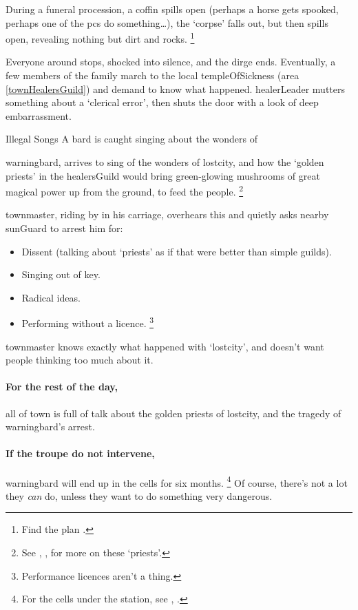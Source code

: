 During a funeral procession, a coffin spills open (perhaps a horse gets spooked, perhaps one of the \glspl{pc} do something\ldots), the `corpse' falls out, but then spills open, revealing nothing but dirt and rocks.%
\footnote{Find the plan .}

Everyone around stops, shocked into silence, and the dirge ends.
Eventually, a few members of the family march to the local \gls{templeOfSickness} (area \vref{townHealersGuild}) and demand to know what happened.
\Gls{healerLeader} mutters something about a `clerical error', then shuts the door with a look of deep embarrassment.

{Illegal Songs}%
{A bard is caught singing about the wonders of }%

\Gls{warningbard}, arrives to sing of the wonders of \gls{lostcity}, and how the `golden priests' in the \gls{healersGuild} would bring green-glowing mushrooms of great magical power up from the ground, to feed the people.%
\footnote{See , , for more on these `priests'.}

\Gls{townmaster}, riding by in his carriage, overhears this and quietly asks nearby \gls{sunGuard} to arrest him for:

\begin{itemize}
  \item
  Dissent (talking about `priests' as if that were better than simple guilds).
  \item
  Singing out of key.
  \item
  Radical ideas.
  \item
  Performing without a licence.%
  \footnote{Performance licences aren't a thing.}
\end{itemize}

\Gls{townmaster} knows exactly what happened with `\gls{lostcity}', and doesn't want people thinking too much about it.

\paragraph{For the rest of the day,}
all of \gls{town} is full of talk about the golden priests of \gls{lostcity}, and the tragedy of \gls{warningbard}'s arrest.

\paragraph{If the troupe do not intervene,}
\gls{warningbard} will end up in the cells for six months.
\footnote{For the cells under the  station, see , .}
Of course, there's not a lot they \emph{can} do, unless they want to do something very dangerous.

